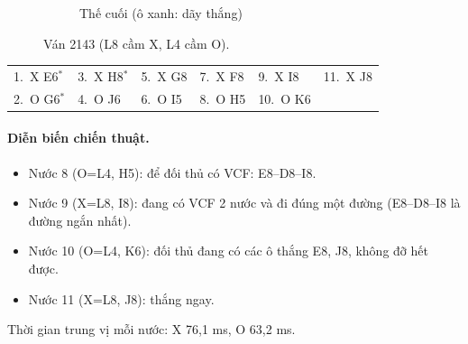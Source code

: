 \begin{figure}[H]
\begin{subfigure}[t]{.48\linewidth}
    \caption{Thế cuối (ô xanh: dãy thắng)}
  \end{subfigure}
  \caption{Ván 2143 (L8 cầm X, L4 cầm O).}
  \label{fig:cs-van-22}
\end{figure}
{\footnotesize\linespread{1}\selectfont
\noindent\begin{tabularx}{\linewidth}{*{6}{X}}
\toprule
1.~X E6$^\ast$ & 3.~X H8$^\ast$ & 5.~X G8 & 7.~X F8 & 9.~X I8 & 11.~X J8 \\
2.~O G6$^\ast$ & 4.~O J6 & 6.~O I5 & 8.~O H5 & 10.~O K6 &  \\
\bottomrule
\end{tabularx}\par}
\paragraph{Diễn biến chiến thuật.}
\begin{itemize}\small
\setlength{\itemsep}{0pt}
  \item Nước 8 (O=L4, H5): để đối thủ có VCF: E8--D8--I8.
  \item Nước 9 (X=L8, I8): đang có VCF 2 nước và đi đúng một đường (E8--D8--I8 là đường ngắn nhất).
  \item Nước 10 (O=L4, K6): đối thủ đang có các ô thắng E8, J8, không đỡ hết được.
  \item Nước 11 (X=L8, J8): thắng ngay.
\end{itemize}
Thời gian trung vị mỗi nước: X 76,1 ms, O 63,2 ms.
\clearpage

